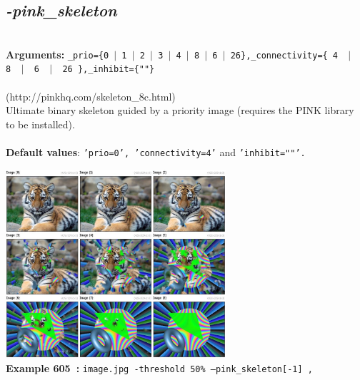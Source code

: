 \documentclass[a4paper,11pt,twoside]{book}
\begin{document}
\subsection{\emph{-pink\_skeleton} }\vspace*{-0.5em}
~\\\textbf{Arguments: } 
{\small \texttt{\_prio=\{0~$|$~1~$|$~2~$|$~3~$|$~4~$|$~8~$|$~6~$|$~26\},\_connectivity=\{ 4 ~$|$~ 8 ~$|$~ 6 ~$|$~ 26 \},\_inhibit=\{""\}}}\\~\\
(http://pinkhq.com/skeleton\_8c.html)
~\\Ultimate binary skeleton guided by a priority image (requires the PINK library to be installed).
~\\~\\\textbf{Default values}: {\small \texttt{'prio=0', 'connectivity=4'} and \texttt{'inhibit=""'.}}
\begin{center}\includegraphics[keepaspectratio=true,height=7cm,width=\textwidth]{img/gmic_def605.jpg}\\
{\footnotesize \textbf{Example 605~:} \texttt{image.jpg -threshold 50\% --pink\_skeleton[-1] ,}}
\end{center}
\end{document}
